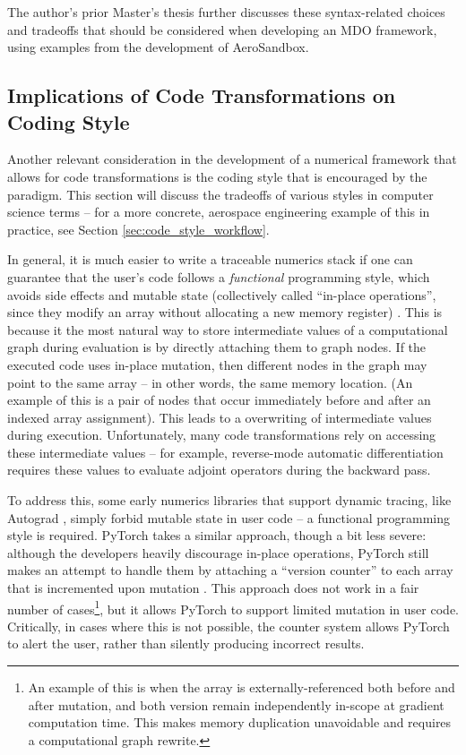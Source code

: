 The author's prior Master's thesis \cite{sharpe_aerosandbox_2021} further discusses these syntax-related choices and tradeoffs that should be considered when developing an MDO framework, using examples from the development of AeroSandbox.

\subsection{Implications of Code Transformations on Coding Style}
\label{sec:code_style}

Another relevant consideration in the development of a numerical framework that allows for code transformations is the coding style that is encouraged by the paradigm. This section will discuss the tradeoffs of various styles in computer science terms -- for a more concrete, aerospace engineering example of this in practice, see Section \ref{sec:code_style_workflow}.

In general, it is much easier to write a traceable numerics stack if one can guarantee that the user's code follows a \emph{functional} programming style, which avoids side effects and mutable state (collectively called ``in-place operations'', since they modify an array without allocating a new memory register) \cite{jax, maclaurin_autograd_2015, maclaurin_modeling_2016}. This is because it the most natural way to store intermediate values of a computational graph during evaluation is by directly attaching them to graph nodes. If the executed code uses in-place mutation, then different nodes in the graph may point to the same array -- in other words, the same memory location. (An example of this is a pair of nodes that occur immediately before and after an indexed array assignment). This leads to a overwriting of intermediate values during execution. Unfortunately, many code transformations rely on accessing these intermediate values -- for example, reverse-mode automatic differentiation requires these values to evaluate adjoint operators during the backward pass.

To address this, some early numerics libraries that support dynamic tracing, like Autograd \cite{maclaurin_autograd_2015, maclaurin_modeling_2016}, simply forbid mutable state in user code -- a functional programming style is required. PyTorch takes a similar approach, though a bit less severe: although the developers heavily discourage in-place operations, PyTorch still makes an attempt to handle them by attaching a ``version counter'' to each array that is incremented upon mutation \cite{paszke_pytorch_2019}. This approach does not work in a fair number of cases\footnote{An example of this is when the array is externally-referenced both before and after mutation, and both version remain independently in-scope at gradient computation time. This makes memory duplication unavoidable and requires a computational graph rewrite.}, but it allows PyTorch to support limited mutation in user code. Critically, in cases where this is not possible, the counter system allows PyTorch to alert the user, rather than silently producing incorrect results.

